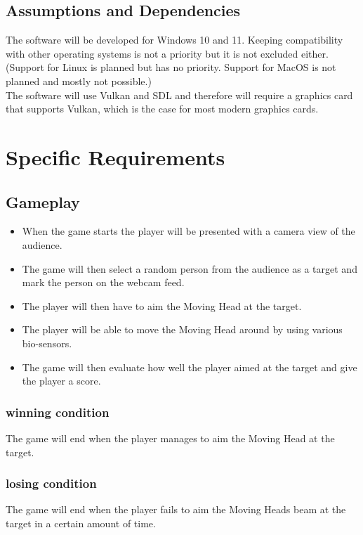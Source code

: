 \documentclass[a4paper]{scrreprt}
\begin{document}
\section{Assumptions and Dependencies}
The software will be developed for Windows 10 and 11. 
Keeping compatibility with other operating systems is not a priority but it is not excluded either. (Support for Linux is planned but has no priority. Support for MacOS is not planned and mostly not possible.) \\
The software will use Vulkan and SDL and therefore will require a graphics card that supports Vulkan, which is the case for most modern graphics cards.

\chapter{Specific Requirements}

\section{Gameplay}

\begin{itemize}
	\item When the game starts the player will be presented with a camera view of the audience. \\
	\item The game will then select a random person from the audience as a target and mark the person on the webcam feed. \\
	\item The player will then have to aim the Moving Head at the target. \\
	\item The player will be able to move the Moving Head around by using various bio-sensors. \\
	\item The game will then evaluate how well the player aimed at the target and give the player a score. \\
\end{itemize}

\subsection{winning condition}
The game will end when the player manages to aim the Moving Head at the target.
\subsection{losing condition}
The game will end when the player fails to aim the Moving Heads beam at the target in a certain amount of time.
\end{document}
